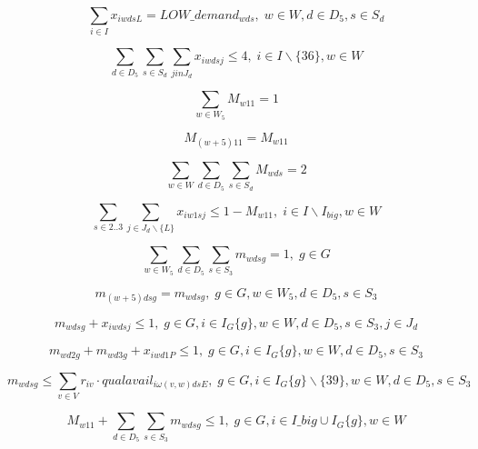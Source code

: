 \begin{equation}
\sum_{i \in I} x_{iwdsL} = LOW\_demand_{wds}, \;   w\in W,d\in D_5,s\in S_d
\end{equation}

\begin{equation}
\sum_{d \in D_5}\sum_{s \in S_d}\sum_{j in J_d} x_{iwdsj} \leq 4, \;   i\in I\backslash\{36\},w\in W
\end{equation}

\begin{equation}
\sum_{w \in W_5} M_{w11} = 1
\end{equation}

\begin{equation}
M_{(w+5)11} = M_{w11}
\end{equation}

\begin{equation}
\sum_{w \in W}\sum_{d \in D_5}\sum_{s \in S_d} M_{wds} = 2
\end{equation}

\begin{equation}
\sum_{s \in 2..3}\sum_{j \in J_d\backslash\{L\}} x_{iw1sj} \leq 1-M_{w11}, \;   i \in I\backslash I_{big}, w \in W
\end{equation}

\begin{equation}
\sum_{w \in W_5}\sum_{d \in D_5}\sum_{s \in S_3} m_{wdsg} = 1, \;   g \in G
\end{equation}

\begin{equation}
m_{(w+5)dsg} = m_{wdsg}, \;   g \in G, w \in W_5, d \in D_5, s \in S_3
\end{equation}

\begin{equation}
m_{wdsg} + x_{iwdsj} \leq 1, \;   g \in G, i \in I_G\{g\}, w \in W, d \in D_5, s \in S_3, j \in J_d
\end{equation}

\begin{equation}
m_{wd2g} + m_{wd3g} + x_{iwd1P} \leq 1, \;   g \in G, i \in I_G\{g\}, w \in W, d \in D_5, s \in S_3
\end{equation}

\begin{equation}
m_{wdsg} \leq \sum_{v \in V}r_{iv}\cdot qualavail_{i\omega(v,w)dsE}, \;   g \in G, i \in I_G\{g\} \backslash \{39\}, w \in W, d \in D_5, s \in S_3
\end{equation}

\begin{equation}
M_{w11} + \sum_{d \in D_5}\sum_{s \in S_3} m_{wdsg} \leq 1, \;   g \in G, i \in I\_big \cup I_G\{g\}, w \in W
\end{equation}

